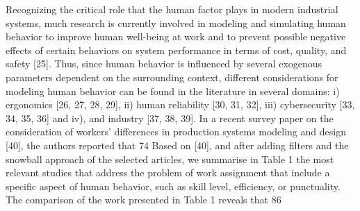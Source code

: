 Recognizing the critical role that the human factor plays in modern industrial systems, much research is currently involved in modeling and simulating human behavior to improve human well-being at work and to prevent possible negative effects of certain behaviors on system performance in terms of cost, quality, and safety [25]. Thus, since human behavior is influenced by several exogenous parameters dependent on the surrounding context, different considerations for modeling human behavior can be found in the literature in several domains: i) ergonomics [26, 27, 28, 29], ii) human reliability [30, 31, 32], iii) cybersecurity [33, 34, 35, 36] and iv), and industry [37, 38, 39]. In a recent survey paper on the consideration of workers’ differences in production systems modeling and design [40], the authors reported that 74%
Based on [40], and after adding filters and the snowball approach of the selected articles, we summarise in Table 1 the most relevant studies that address the problem of work assignment that include a specific aspect of human behavior, such as skill level, efficiency, or punctuality. The comparison of the work presented in Table 1 reveals that 86%
